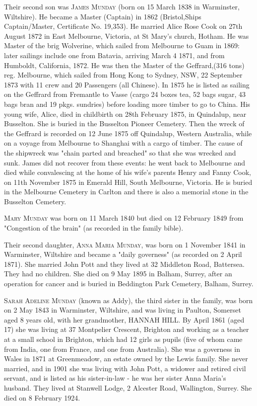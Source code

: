 {Their second son was \textsc{James Munday} (born on 15 March 1838 in Warminster, Wiltshire).  He became a Master (Captain) in 1862 (Bristol,Ships Captain/Master, Certificate No. 19,353).  He married Alice Rose Cook on 27th August 1872 in	East Melbourne, Victoria, at St Mary's church, Hotham. He was Master of the brig Wolverine, which sailed from Melbourne to Guam in 1869: later sailings include one from Batavia, arriving March 4 1871, and from Humboldt, California, 1872. He was then the Master of the Geffrard,(316 tons) reg. Melbourne, which sailed from Hong Kong to Sydney, NSW, 22 September 1873 with 11 crew and 20 Passengers (all Chinese). In 1875 he is listed as sailing on the Geffrard from Fremantle to Vasse (cargo 24 boxes tea, 52 bags sugar, 43 bags bran and 19 pkgs. sundries) before loading more timber to go to China. His young wife, Alice, died in childbirth on 28th February 1875, in Quindalup, near Busselton. She is buried in the Busselton Pioneer Cemetery.  Then the wreck of the Geffrard is recorded on 12 June 1875 off Quindalup, Western Australia, while on a voyage from Melbourne to Shanghai with a cargo of timber. The cause of the shipwreck was "chain parted and breached" so that she was wrecked and sunk. James did not recover from these events: he went back to Melbourne and died while convalescing at the home of his wife's parents Henry and Fanny Cook, on 11th November 1875 in Emerald Hill, South Melbourne, Victoria. He is buried in the Melbourne Cemetery in Carlton and there is also a memorial stone in the Busselton Cemetery.  

\textsc{Mary Munday} was born on 11 March 1840 but died on 12 February 1849 from	"Congestion of the brain" (as recorded in the family bible). 

Their second daughter, \textsc{Anna Maria Munday}, was born on 1 November 1841 in Warminster, Wiltshire and became a "daily governess" (as recorded on 2 April 1871). She married John Pott and they lived at 32 Middleton Road, Battersea. They had no children.  She died on	9 May 1895 in Balham, Surrey, after an operation for cancer and is buried in Beddington Park Cemetery, Balham, Surrey.  

\textsc{Sarah Adeline Munday} (known as Addy), the third sister in the family, was  born on 2 May 1843 in Warminster, Wiltshire, and was living in Paulton, Somerset aged 8 years old, with her grandmother, \uppercase{Hannah Hill}. By April 1861 (aged 17) she was living at 37 Montpelier Crescent, Brighton and working as a teacher at a small school in Brighton, which had 12 girls as pupils (five of whom came from India, one from France, and one from Australia). She was a governess in Wales in 1871 at Greenmeadow, an estate owned by the Lewis family. She never married, and in 1901 she was living with John Pott, a widower and retired civil servant, and is listed as his sister-in-law - he was her sister Anna Maria's husband. They lived at Stanwell Lodge, 2 Alcester Road, Wallington, Surrey. She died on 8 February 1924. 

}
